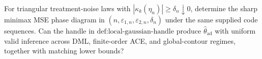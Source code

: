 For triangular treatment-noise laws with \(|\kappa_k(\eta_n)|\ge\delta_n\downarrow0\), determine the sharp minimax MSE phase diagram in \((n,\varepsilon_{1,n},\varepsilon_{2,n},\delta_n)\) under the same supplied code sequences. Can the handle in \(\text{def:local-gaussian-handle}\) produce \(\widehat\theta_{\mathrm{ad}}\) with uniform valid inference across DML, finite-order ACE, and global-contour regimes, together with matching lower bounds?